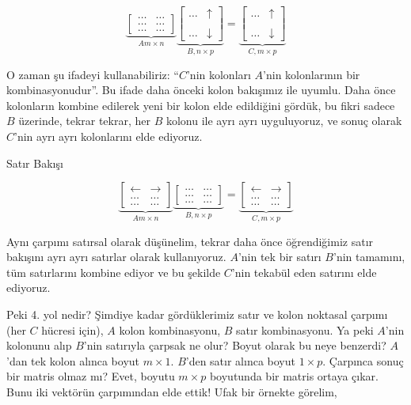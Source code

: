 \documentclass[12pt,fleqn]{article}\usepackage{../../common}
\begin{document}
$$ 
\underbrace{
\left[\begin{array}{rr}
\dots & \dots   \\
\dots & \dots   \\
\dots & \dots 
\end{array}\right]
}_{A m \times n}
\underbrace{
\left[\begin{array}{rr}
\dots & \uparrow \\
& \\
\dots & \downarrow
\end{array}\right] 
}_{B, n \times p}
=
\underbrace{
\left[\begin{array}{rr}
\dots & \uparrow \\
& \\
\dots & \downarrow
\end{array}\right] 
}_{C, m \times p}
$$

O zaman şu ifadeyi kullanabiliriz: ``$C$'nin kolonları $A$'nin kolonlarının
bir kombinasyonudur''. Bu ifade daha önceki kolon bakışımız ile
uyumlu. Daha önce kolonların kombine edilerek yeni bir kolon elde
edildiğini gördük, bu fikri sadece $B$ üzerinde, tekrar tekrar, her $B$
kolonu ile ayrı ayrı uyguluyoruz, ve sonuç olarak $C$'nin ayrı ayrı
kolonlarını elde ediyoruz.

Satır Bakışı

$$ 
\underbrace{
\left[\begin{array}{rr}
\leftarrow  & \rightarrow  \\
\dots & \dots \\
\dots & \dots 
\end{array}\right]
}_{A m \times n}
\underbrace{
\left[\begin{array}{rr}
\dots & \dots \\
\dots & \dots \\
\dots & \dots
\end{array}\right] 
}_{B, n \times p}
=
\underbrace{
\left[\begin{array}{rr}
\leftarrow  & \rightarrow  \\
\dots & \dots  \\
\dots & \dots 
\end{array}\right] 
}_{C, m \times p}
$$

Aynı çarpımı satırsal olarak düşünelim, tekrar daha önce öğrendiğimiz satır
bakışını ayrı ayrı satırlar olarak kullanıyoruz. $A$'nin tek bir satırı
$B$'nin tamamını, tüm satırlarını kombine ediyor ve bu şekilde $C$'nin
tekabül eden satırını elde ediyoruz. 

Peki 4. yol nedir? Şimdiye kadar gördüklerimiz satır ve kolon noktasal
çarpımı (her $C$ hücresi için), $A$ kolon kombinasyonu, $B$ satır
kombinasyonu. Ya peki $A$'nin kolonunu alıp $B$'nin satırıyla çarpsak ne
olur? Boyut olarak bu neye benzerdi? $A$'dan tek kolon alınca boyut $m
\times 1$. $B$'den satır alınca boyut $1 \times p$. Çarpınca sonuç bir
matris olmaz mı? Evet, boyutu $m \times p$ boyutunda bir matris ortaya
çıkar. Bunu iki vektörün çarpımından elde ettik! Ufak bir örnekte görelim, 
\end{document}
